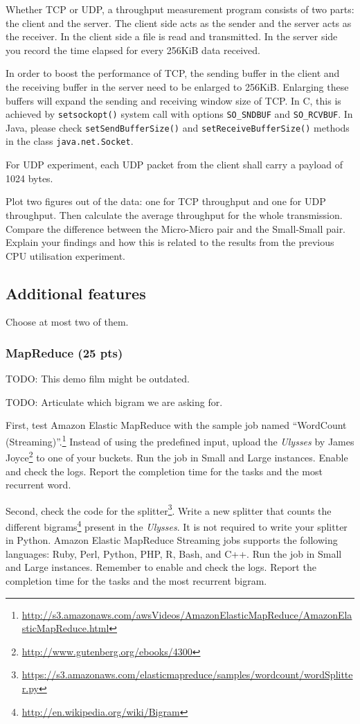 \documentclass[12pt, a4paper]{article}
\newcommand{\TODO}[1]{\noindent\colorbox{aaltoYellow}{\color{black} TODO: #1}}
\begin{document}
Whether TCP or UDP, a throughput measurement program consists of two parts: the client and the server.
The client side acts as the sender and the server acts as the receiver.
In the client side a file is read and transmitted.
In the server side you record the time elapsed for every 256KiB data received.

In order to boost the performance of TCP, the sending buffer in the client and the receiving buffer in the server need to be enlarged to 256KiB.
Enlarging these buffers will expand the sending and receiving window size of TCP.
In C, this is achieved by \texttt{setsockopt()} system call with options \texttt{SO\_SNDBUF} and \texttt{SO\_RCVBUF}.
In Java, please check \texttt{setSendBufferSize()} and \texttt{setReceiveBufferSize()} methods in the class \texttt{java.net.Socket}.

For UDP experiment, each UDP packet from the client shall carry a payload of 1024 bytes.

Plot two figures out of the data: one for TCP throughput and one for UDP throughput.
Then calculate the average throughput for the whole transmission.
Compare the difference between the Micro-Micro pair and the Small-Small pair.
Explain your findings and how this is related to the results from the previous CPU utilisation experiment.
\subsection{Additional features}
Choose at most two of them.

\subsubsection{MapReduce (25 pts)}

\TODO{} This demo film might be outdated.

\TODO{} Articulate which bigram we are asking for.

First, test Amazon Elastic MapReduce with the sample job named ``WordCount (Streaming)''.\footnote{\url{http://s3.amazonaws.com/awsVideos/AmazonElasticMapReduce/AmazonElasticMapReduce.html}}
Instead of using the predefined input, upload the \emph{Ulysses} by James Joyce\footnote{\url{http://www.gutenberg.org/ebooks/4300}} to one of your buckets.
Run the job in Small and Large instances.
Enable and check the logs.
Report the completion time for the tasks and the most recurrent word.

Second, check the code for the splitter\footnote{\url{https://s3.amazonaws.com/elasticmapreduce/samples/wordcount/wordSplitter.py}}.
Write a new splitter that counts the different bigrams\footnote{\url{http://en.wikipedia.org/wiki/Bigram}} present in the \emph{Ulysses}.
It is not required to write your splitter in Python.
Amazon Elastic MapReduce Streaming jobs supports the following languages: Ruby, Perl, Python, PHP, R, Bash, and C++.
Run the job in Small and Large instances.
Remember to enable and check the logs.
Report the completion time for the tasks and the most recurrent bigram.
\end{document}
